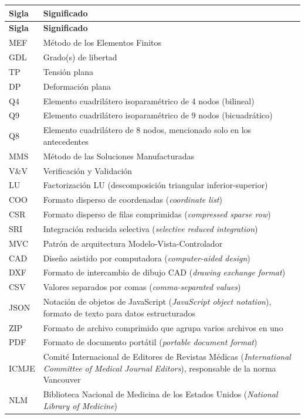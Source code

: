 \begin{longtable}{@{}p{2.4cm}p{11.4cm}@{}}
\toprule
\textbf{Sigla} & \textbf{Significado} \\
\midrule
\endfirsthead
\toprule
\textbf{Sigla} & \textbf{Significado} \\
\midrule
\endhead
\bottomrule
\endfoot
MEF & Método de los Elementos Finitos \\
GDL & Grado(s) de libertad \\
TP & Tensión plana \\
DP & Deformación plana \\
Q4 & Elemento cuadrilátero isoparamétrico de 4 nodos (bilineal) \\
Q9 & Elemento cuadrilátero isoparamétrico de 9 nodos (bicuadrático) \\
Q8 & Elemento cuadrilátero de 8 nodos, mencionado solo en los antecedentes \\
MMS & Método de las Soluciones Manufacturadas \\
V\&V & Verificación y Validación \\
LU & Factorización LU (descomposición triangular inferior-superior) \\
COO & Formato disperso de coordenadas (\emph{coordinate list}) \\
CSR & Formato disperso de filas comprimidas (\emph{compressed sparse row}) \\
SRI & Integración reducida selectiva (\emph{selective reduced integration}) \\
MVC & Patrón de arquitectura Modelo-Vista-Controlador \\
CAD & Diseño asistido por computadora (\emph{computer-aided design}) \\
DXF & Formato de intercambio de dibujo CAD (\emph{drawing exchange format}) \\
CSV & Valores separados por comas (\emph{comma-separated values}) \\
JSON & Notación de objetos de JavaScript (\emph{JavaScript object notation}), formato de texto para datos estructurados \\
ZIP & Formato de archivo comprimido que agrupa varios archivos en uno \\
PDF & Formato de documento portátil (\emph{portable document format}) \\
ICMJE & Comité Internacional de Editores de Revistas Médicas (\emph{International Committee of Medical Journal Editors}), responsable de la norma Vancouver \\
NLM & Biblioteca Nacional de Medicina de los Estados Unidos (\emph{National Library of Medicine}) \\

\end{longtable}
